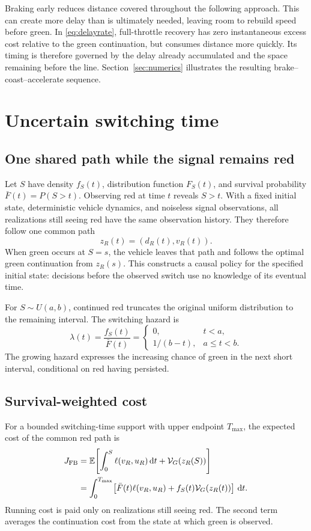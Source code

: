 \documentclass[journal,a4paper,twocolumn]{IEEEtran}
\newcommand{\dd}{\,\mathrm{d}}
\begin{document}
Braking early reduces distance covered throughout the following approach. This can create more delay than is ultimately needed, leaving room to rebuild speed before green. In \eqref{eq:delayrate}, full-throttle recovery has zero instantaneous excess cost relative to the green continuation, but consumes distance more quickly. Its timing is therefore governed by the delay already accumulated and the space remaining before the line. Section~\ref{sec:numerics} illustrates the resulting brake--coast--accelerate sequence.

\section{Uncertain switching time}\label{sec:feedback}
\subsection{One shared path while the signal remains red}
Let $S$ have density $f_S(t)$, distribution function $F_S(t)$, and survival probability $\bar F(t)=P(S>t)$. Observing red at time $t$ reveals $S>t$. With a fixed initial state, deterministic vehicle dynamics, and noiseless signal observations, all realizations still seeing red have the same observation history. They therefore follow one common path
\begin{equation}
 z_R(t)=(d_R(t),v_R(t)).
\end{equation}
When green occurs at $S=s$, the vehicle leaves that path and follows the optimal green continuation from $z_R(s)$. This constructs a causal policy for the specified initial state: decisions before the observed switch use no knowledge of its eventual time.

For $S\sim U(a,b)$, continued red truncates the original uniform distribution to the remaining interval. The switching hazard is
\begin{equation}
 \lambda(t)=\frac{f_S(t)}{\bar F(t)}
 =\begin{cases}
 0,&t<a,\\
 1/(b-t),&a\le t<b.
 \end{cases}
 \label{eq:hazard}
\end{equation}
The growing hazard expresses the increasing chance of green in the next short interval, conditional on red having persisted.

\subsection{Survival-weighted cost}
For a bounded switching-time support with upper endpoint $T_{\max}$, the expected cost of the common red path is
\begin{align}
 J_{\rm FB}
 &=\mathbb E\!\left[\int_0^S\ell(v_R,u_R)\dd t
 +\mathcal V_G(z_R(S))\right]\notag\\
 &=\int_0^{T_{\max}}\!\left[
 \bar F(t)\ell(v_R,u_R)+f_S(t)\mathcal V_G(z_R(t))
 \right]\dd t.
 \label{eq:survivalobjective}
\end{align}
Running cost is paid only on realizations still seeing red. The second term averages the continuation cost from the state at which green is observed.
\end{document}
